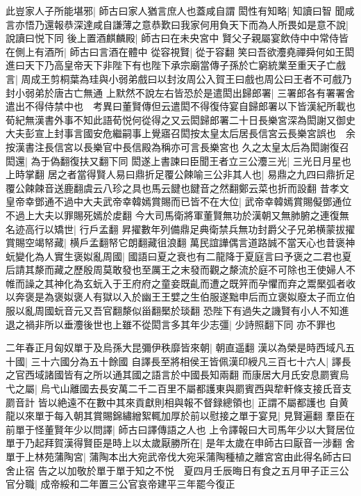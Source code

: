 此豈家人子所能堪邪|{
	師古曰家人猶言庶人也蓋咸自謂}
閎性有知略|{
	知讀曰智}
聞咸言亦悟乃還報恭深達咸自謙薄之意恭歎曰我家何用負天下而為人所畏如是意不說|{
	說讀曰悦下同}
後上置酒麒麟殿|{
	師古曰在未央宮中}
賢父子親屬宴飲侍中中常侍皆在側上有酒所|{
	師古曰言酒在體中}
從容視賢|{
	從于容翻}
笑曰吾欲灋堯禪舜何如王閎進曰天下乃高皇帝天下非陛下有也陛下承宗廟當傳子孫於亡窮統業至重天子亡戲言|{
	周成王剪桐葉為珪與小弱弟戲曰以封汝周公入賀王曰戲也周公曰王者不可戲乃封小弱弟於唐古亡無通}
上默然不說左右皆恐於是遣閎出歸郎署|{
	三署郎各有署署舍遣出不得侍禁中也　考異曰董賢傳但云遣閎不得復侍宴自歸郎署以下皆漢紀所載也荀紀無漢書外事不知此語荀悦何從得之又云閎歸郎署二十日長樂宮深為閎謝又御史大夫彭宣上封事言國安危繼嗣事上覺寤召閎按太皇太后居長信宮云長樂宮誤也　余按漢書注長信宮以長樂官中長信殿為稱亦可言長樂宮也}
久之太皇太后為閎謝復召閎還|{
	為于偽翻復扶又翻下同}
閎遂上書諫曰臣聞王者立三公灋三光|{
	三光日月星也上時掌翻}
居之者當得賢人易曰鼎折足覆公餗喻三公非其人也|{
	易鼎之九四曰鼎折足覆公餗餗音送鹿翻虞云八珍之具也馬云䭈也䭈音之然翻鄭云菜也折而設翻}
昔孝文皇帝幸鄧通不過中大夫武帝幸韓嫣賞賜而已皆不在大位|{
	武帝幸韓嫣賞賜儗鄧通位不過上大夫以罪賜死嫣於䖍翻}
今大司馬衛將軍董賢無功於漢朝又無肺腑之連復無名迹高行以矯世|{
	行戶孟翻}
昇擢數年列備鼎足典衛禁兵無功封爵父子兄弟横蒙拔擢賞賜空竭帑藏|{
	横戶孟翻帑它朗翻藏徂浪翻}
萬民誼譁偶言道路誠不當天心也昔褒神蚖變化為人實生褒姒亂周國|{
	國語曰夏之衰也有二龍降于夏庭言曰予褒之二君也夏后請其漦而藏之歷殷周莫敢發也至厲王之末發而觀之漦流於庭不可除也王使婦人不帷而譟之其神化為玄蚖入于王府府之童妾既齓而遭之既笄而孕懼而弃之鬻檿弧者收以奔褒是為褒姒褒人有獄以入於幽王王嬖之生伯服遂黜申后而立褒姒廢太子而立伯服以亂周國蚖音元又吾官翻漦似甾翻檿於琰翻}
恐陛下有過失之譏賢有小人不知進退之禍非所以垂灋後世也上雖不從閎言多其年少志彊|{
	少詩照翻下同}
亦不罪也

二年春正月匈奴單于及烏孫大昆彌伊秩靡皆來朝|{
	朝直遥翻}
漢以為榮是時西域凡五十國|{
	三十六國分為五十餘國}
自譯長至將相侯王皆佩漢印綬凡三百七十六人|{
	譯長之官西域諸國皆有之所以通其國之語言於中國長知兩翻}
而康居大月氏安息罽賓烏弋之屬|{
	烏弋山離國去長安萬二千二百里不屬都護東與罽賓西與犂軒條支接氏音支罽音計}
皆以絶遠不在數中其來貢獻則相與報不督録總領也|{
	正謂不屬都護也}
自黄龍以來單于每入朝其賞賜錦繡繒絮輒加厚於前以慰接之單于宴見|{
	見賢遍翻}
羣臣在前單于怪董賢年少以問譯|{
	師古曰譯傳語之人也}
上令譯報曰大司馬年少以大賢居位單于乃起拜賀漢得賢臣是時上以太歲厭勝所在|{
	是年太歲在申師古曰厭音一涉翻}
舍單于上林苑蒲陶宮|{
	蒲陶本出大宛武帝伐大宛采蒲陶種植之離宮宮由此得名師古曰舍止宿}
告之以加敬於單于單于知之不悦　夏四月壬辰晦日有食之五月甲子正三公官分職|{
	成帝綏和二年置三公官哀帝建平三年罷今復正}


